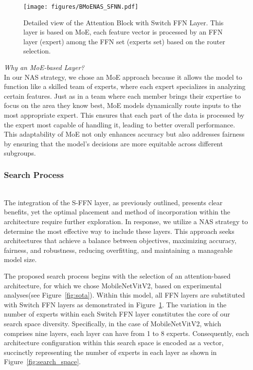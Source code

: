 \begin{figure}[t]
    \centering
\texttt{[image: figures/BMoENAS\_SFNN.pdf]}
    \caption{Detailed view of the Attention Block with Switch FFN Layer. This layer is based on MoE, each feature vector is processed by an FFN layer (expert) among the FFN set (experts set) based on the router selection.}
    \label{fig:switch_fnn}
\end{figure}


\textit{Why an MoE-based Layer?}\\
In our NAS strategy, we chose an MoE approach because it allows the model to function like a skilled team of experts, where each expert specializes in analyzing certain features. Just as in a team where each member brings their expertise to focus on the area they know best, MoE models dynamically route inputs to the most appropriate expert. This ensures that each part of the data is processed by the expert most capable of handling it, leading to better overall performance. This adaptability of MoE not only enhances accuracy but also addresses fairness by ensuring that the model's decisions are more equitable across different subgroups.

\subsubsection{Search Process}~\\ \label{method:search-process}
The integration of the S-FFN layer, as previously outlined, presents clear benefits, yet the optimal placement and method of incorporation within the architecture require further exploration. In response, we utilize a NAS strategy to determine the most effective way to include these layers. This approach seeks architectures that achieve a balance between objectives, maximizing accuracy, fairness, and robustness, reducing overfitting, and maintaining a manageable model size.

The proposed search process begins with the selection of an attention-based architecture, for which we chose MobileNetVitV2, based on experimental analyses(see Figure~\ref{fig:sota}). Within this model, all FFN layers are substituted with Switch FFN layers as demonstrated in Figure~\ref{fig:switch_fnn}. The variation in the number of experts within each Switch FFN layer constitutes the core of our search space diversity. Specifically, in the case of MobileNetVitV2, which comprises nine layers, each layer can have from 1 to 8 experts. Consequently, each architecture configuration within this search space is encoded as a vector, succinctly representing the number of experts in each layer as shown in Figure~\ref{fig:search_space}.

